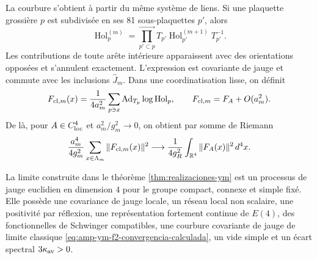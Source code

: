 La courbure s’obtient à partir du même système de liens. Si une plaquette
grossière \(p\) est subdivisée en ses 81 sous-plaquettes \(p'\), alors
\begin{equation}\label{eq:amp-ym-producto-superficial}
 \operatorname{Hol}^{(m)}_{p}
 =\prod_{p'\subset p}^{\longrightarrow}
 T_{p'}\operatorname{Hol}^{(m+1)}_{p'}T_{p'}^{-1}.
\end{equation}
Les contributions de toute arête intérieure apparaissent avec des orientations opposées et s'annulent exactement. L'expression est covariante de jauge et commute avec les inclusions \(\widehat J_m\). Dans une coordinatisation lisse, on définit
\begin{equation}\label{eq:amp-ym-clover-definido}
 F_{{\rm cl},m}(x)
 =\frac1{4a_m^2}\sum_{p\ni x}
 \operatorname{Ad}_{T_p}\log\operatorname{Hol}_{p},
 \qquad
 F_{{\rm cl},m}=F_A+O(a_m^2).
\end{equation}
De là, pour \(A\in C^4_{\rm loc}\) et
\(a_m^2/g_m^2\to0\), on obtient par somme de Riemann
\begin{equation}\label{eq:amp-ym-f2-convergencia-calculada}
 \frac{a_m^4}{4g_m^2}
 \sum_{x\in\Lambda_m}\|F_{{\rm cl},m}(x)\|^2
 \longrightarrow
 \frac1{4g_R^2}\int_{\mathbb R^4}\|F_A(x)\|^2\,d^4x.
\end{equation}

\begin{theorem}
\label{thm:amp-ym-identificacion-gauge}
La limite construite dans le théorème
\ref{thm:realizaciones-ym} est un processus de jauge euclidien en dimension
\(4\) pour le groupe compact, connexe et simple fixé. Elle possède
une covariance de jauge locale, un réseau local non scalaire, une positivité par
réflexion, une représentation fortement continue de \(E(4)\),
des fonctionnelles de Schwinger compatibles, une courbure covariante de jauge de limite
classique \eqref{eq:amp-ym-f2-convergencia-calculada}, un vide simple et un écart
spectral
\(3\kappa_{\rm av}>0\).
\end{theorem}

